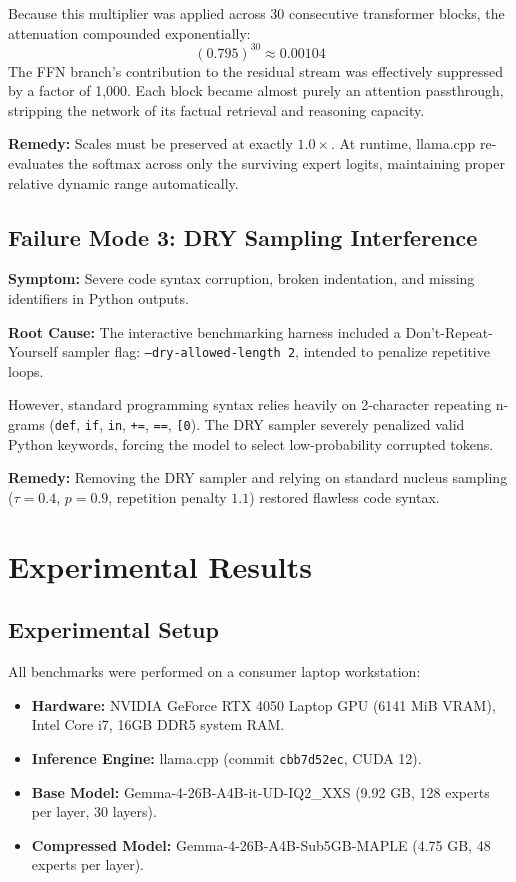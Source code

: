 \documentclass[conference]{IEEEtran}
\newcommand{\MAPLE}{\textsc{MAPLE}}
\begin{document}
Because this multiplier was applied across 30 consecutive transformer blocks, the attenuation compounded exponentially:
\begin{equation}
(0.795)^{30} \approx 0.00104
\end{equation}
The FFN branch's contribution to the residual stream was effectively suppressed by a factor of 1,000. Each block became almost purely an attention passthrough, stripping the network of its factual retrieval and reasoning capacity.

\textbf{Remedy:} Scales must be preserved at exactly $1.0\times$. At runtime, llama.cpp re-evaluates the softmax across only the surviving expert logits, maintaining proper relative dynamic range automatically.

\subsection{Failure Mode 3: DRY Sampling Interference}
\textbf{Symptom:} Severe code syntax corruption, broken indentation, and missing identifiers in Python outputs.

\textbf{Root Cause:} The interactive benchmarking harness included a Don't-Repeat-Yourself sampler flag: \texttt{--dry-allowed-length 2}, intended to penalize repetitive loops.

However, standard programming syntax relies heavily on 2-character repeating n-grams (\texttt{def}, \texttt{if}, \texttt{in}, \texttt{+=}, \texttt{==}, \texttt{[0}). The DRY sampler severely penalized valid Python keywords, forcing the model to select low-probability corrupted tokens.

\textbf{Remedy:} Removing the DRY sampler and relying on standard nucleus sampling ($\tau=0.4$, $p=0.9$, repetition penalty $1.1$) restored flawless code syntax.

\section{Experimental Results}

\subsection{Experimental Setup}
All benchmarks were performed on a consumer laptop workstation:
\begin{itemize}
\item \textbf{Hardware:} NVIDIA GeForce RTX 4050 Laptop GPU (6141 MiB VRAM), Intel Core i7, 16GB DDR5 system RAM.
\item \textbf{Inference Engine:} llama.cpp (commit \texttt{cbb7d52ec}, CUDA 12).
\item \textbf{Base Model:} Gemma-4-26B-A4B-it-UD-IQ2\_XXS (9.92 GB, 128 experts per layer, 30 layers).
\item \textbf{Compressed Model:} Gemma-4-26B-A4B-Sub5GB-\MAPLE{} (4.75 GB, 48 experts per layer).
\end{itemize}
\end{document}
